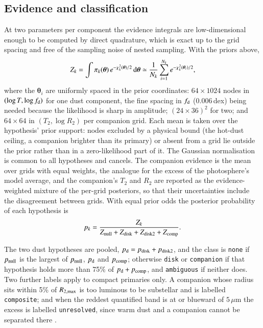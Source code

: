 \documentclass{aa}
\begin{document}
\subsection{Evidence and classification}
\label{sec:evidence}

At two parameters per component the evidence integrals are low-dimensional
enough to be computed by direct quadrature, which is exact up to the grid spacing
and free of the sampling noise of nested sampling. With the priors above,
\begin{equation}
  Z_k = \int \pi_k(\boldsymbol\theta)\,
        e^{-\chi^2_k(\boldsymbol\theta)/2}\, {\rm d}\boldsymbol\theta
      \simeq \frac{1}{N_k}\sum_{i=1}^{N_k} e^{-\chi^2_k(\boldsymbol\theta_i)/2} ,
\end{equation}
where the $\boldsymbol\theta_i$ are uniformly spaced in the prior coordinates:
$64 \times 1024$ nodes in $(\log T, \log f_{\rm d})$ for one dust component, the
fine spacing in $f_{\rm d}$ (0.006\,dex) being needed because the likelihood is
sharp in amplitude; $(24 \times 36)^2$ for two; and $64 \times 64$ in
$(T_2, \log R_2)$ per companion grid. Each mean is taken over the hypothesis'
prior support: nodes excluded by a physical bound (the hot-dust ceiling, a
companion brighter than its primary) or absent from a grid lie outside the prior
rather than in a zero-likelihood part of it. The Gaussian normalisation is common
to all hypotheses and cancels. The companion evidence is the mean over grids with equal
weights, the analogue for the excess of the photosphere's model average, and the
companion's $T_2$ and $R_2$ are reported as the evidence-weighted mixture of the
per-grid posteriors, so that their uncertainties include the disagreement between
grids. With equal prior odds the posterior probability of each hypothesis is
\begin{equation}
  p_k = \frac{Z_k}{Z_{\rm null} + Z_{\rm disk} + Z_{\rm disk2} + Z_{\rm comp}} .
  \label{eq:probs}
\end{equation}

The two dust hypotheses are pooled, $p_{\rm d} = p_{\rm disk} + p_{\rm disk2}$,
and the class is \texttt{none} if $p_{\rm null}$ is the largest of
$p_{\rm null}$, $p_{\rm d}$ and $p_{\rm comp}$; otherwise \texttt{disk} or
\texttt{companion} if that hypothesis holds more than 75\% of
$p_{\rm d} + p_{\rm comp}$, and \texttt{ambiguous} if neither does. Two further
labels apply to compact primaries only. A companion whose radius sits within 5\%
of $R_{2,\rm max}$ is too luminous to be substellar and is labelled
\texttt{composite}; and when the reddest quantified band is at or blueward of
$5\,\mu$m the excess is labelled \texttt{unresolved}, since warm dust and a
companion cannot be separated there \citep{owens2023}.
\end{document}
